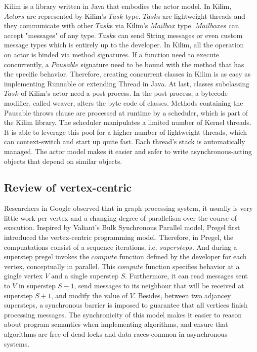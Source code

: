 \documentclass[twocolumn,a4paper,10pt]{article}
\begin{document}
Kilim is a library written in Java that embodies the actor model. In Kilim, $Actors$ are represented by Kilim's $Task$ type. $Task$s are lightweight threads and they communicate with other $Task$s via Kilim's $Mailbox$ type. $Mailboxe$s can accept "messages" of any type. $Task$s can send String messages or even custom message types which is entirely up to the developer. In Kilim, all the operation on actor is binded via method signatures. If a  function need to execute concurrently, a $Pausable$ signature need to be bound with the method that has the specific behavior. Therefore, creating concurrent classes in Kilim is as easy as implementing Runnable or extending Thread in Java. At last, classes subclassing $Task$ of Kilim's actor need a post process. In the post process, a bytecode modifier, called weaver, alters the byte code of classes. Methods containing the Pausable throws clause are processed at runtime by a scheduler, which is part of the Kilim library. The scheduler manipulates a limited number of Kernel threads. It is able to leverage this pool for a higher number of lightweight threads, which can context-switch and start up quite fast. Each thread's stack is automatically managed. The actor model makes it easier and safer to write asynchronous-acting objects that depend on similar objects.


\subsection{Review of vertex-centric }
Researchers in Google observed that in graph processing system, it usually is very little work per vertex and a changing degree of parallelism over the course of execution. Inspired by  Valiant's Bulk Synchronous Parallel model, Pregel first introduced the vertex-centric programming model. Therefore, in Pregel, the compuatations consist of a sequence iterations, i.e. $supersteps$. And during a superstep pregel invokes the $compute$ function defined by the developer for each vertex, conceptually in parallel. This $compute$ function specifies behavior at a gingle vertex $V$ and a single superstep $S$. Furthermore, it can read messages sent to $V$ in superstep $S-1$, send messages to its neighbour that will be received at superstep $S+1$, and modify the value of $V$. Besides, between two adjancey supersteps, a synchronous barrier is imposed to guarantee that all vertices finish processing messages. The synchronicity of this model makes it easier to reason about program semantics when implementing algorithms, and ensure that algorithms are free of dead-locks and data races common in asynchronous systems. 
\end{document}
